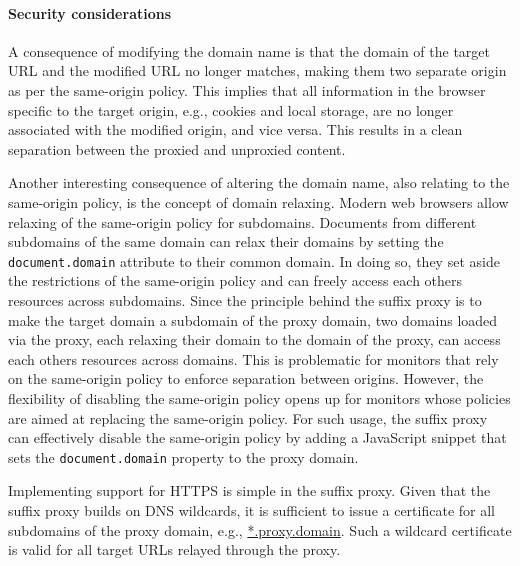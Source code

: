 \documentclass{llncs}
\newcommand{\todo}[1]{\colorbox{red}{\textcolor{white}{\sffamily\bfseries\scriptsize TODO}} \textcolor{red}{#1} \textcolor{red}{$\blacktriangleleft$}}
\begin{document}




\vspace{-.4cm}
\paragraph{Security considerations}

A consequence of modifying the domain name is that the domain of the
target URL and the modified URL no longer matches, making them two 
separate origin as per the same-origin policy. This implies that all information in 
the browser specific to the target origin, e.g., cookies and local storage, 
are no longer associated with the modified origin, and vice versa. This results 
in a clean separation between the proxied and unproxied content.  

Another interesting consequence of altering the domain name, also relating to 
the same-origin policy, is the concept of domain relaxing. Modern web browsers 
allow relaxing of the same-origin policy for subdomains. Documents from different subdomains of the same 
domain can relax their domains by setting the \lstinline{document.domain} attribute
to their common domain. In doing so, they set aside the restrictions of the 
same-origin policy and can freely access each others resources across subdomains. 
Since the principle behind the suffix proxy is to make the target domain a subdomain of the proxy domain, two 
domains loaded via the proxy, each relaxing their domain to the domain of the 
proxy, can access each others resources across domains.
This is problematic for monitors that rely on the same-origin policy to enforce 
separation between origins. However, the flexibility of disabling the same-origin
policy opens up for monitors whose policies are aimed
at replacing the same-origin policy. 
For such usage, the suffix proxy can effectively disable the same-origin 
policy by adding a JavaScript snippet that sets the \lstinline{document.domain} property
to the proxy domain. 


Implementing support for HTTPS is simple in the suffix proxy. 
Given that the suffix proxy builds on DNS wildcards, it is sufficient to issue a certificate
for all subdomains of the proxy domain, e.g., \url{*.proxy.domain}. Such a 
wildcard certificate is valid for all target URLs relayed through the proxy.
\end{document}
